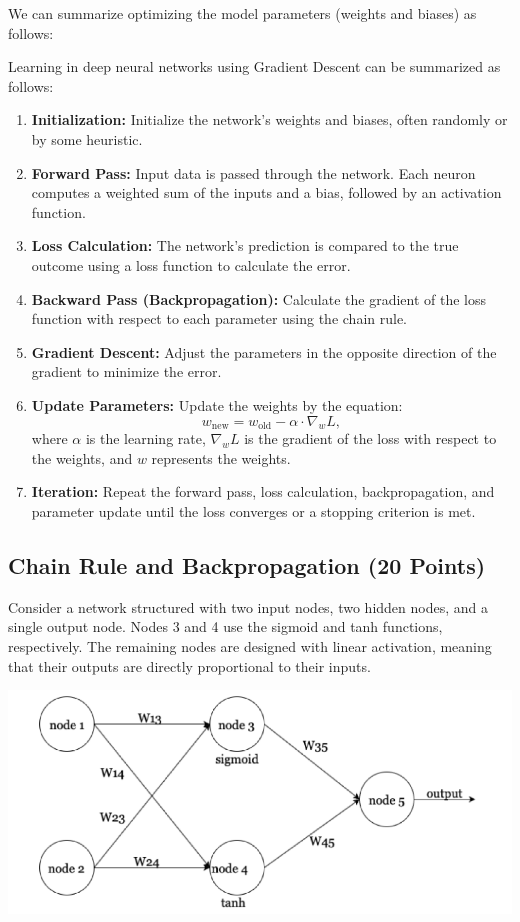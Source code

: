 \documentclass{article}
\begin{document}
We can summarize optimizing the model parameters (weights and biases) as follows:

Learning in deep neural networks using Gradient Descent can be summarized as follows:
\begin{enumerate}
    \item \textbf{Initialization:} Initialize the network’s weights and biases, often randomly or by some heuristic.
    \item \textbf{Forward Pass:} Input data is passed through the network. Each neuron computes a weighted sum of the inputs and a bias, followed by an activation function.
    \item \textbf{Loss Calculation:} The network’s prediction is compared to the true outcome using a loss function to calculate the error.
    \item \textbf{Backward Pass (Backpropagation):} Calculate the gradient of the loss function with respect to each parameter using the chain rule.
    \item \textbf{Gradient Descent:} Adjust the parameters in the opposite direction of the gradient to minimize the error.
    \item \textbf{Update Parameters:} Update the weights by the equation:
    \[
    w_{\text{new}} = w_{\text{old}} - \alpha \cdot \nabla_w L,
    \]
    where $\alpha$ is the learning rate, $\nabla_w L$ is the gradient of the loss with respect to the weights, and $w$ represents the weights.
    \item \textbf{Iteration:} Repeat the forward pass, loss calculation, backpropagation, and parameter update until the loss converges or a stopping criterion is met.
\end{enumerate}

\subsection{Chain Rule and Backpropagation (20 Points)}
Consider a network structured with two input nodes, two hidden nodes, and a single output node. Nodes 3 and 4 use the sigmoid and tanh functions, respectively. The remaining nodes are designed with linear activation, meaning that their outputs are directly proportional to
their inputs.

\begin{center}
    
\includegraphics[scale=0.4]{nn.png}
\end{center}
\end{document}
